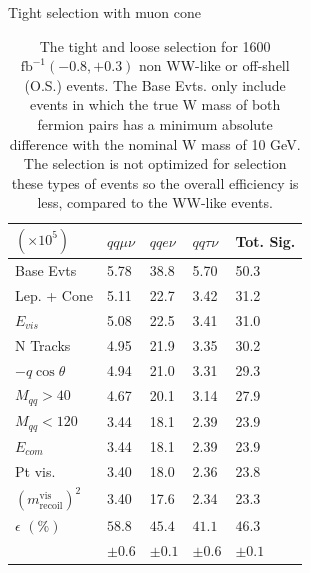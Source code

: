 \begin{table}
\centering
\caption{The tight and loose selection for 1600 $\text{fb}^{-1} (-0.8,+0.3)$ non WW-like or off-shell (O.S.) events.  The Base
Evts. only include events in which the true W mass of both fermion pairs has a minimum absolute difference
with the nominal W mass of 10 GeV. The selection is not optimized for selection these types of events so the overall efficiency is less, compared to the WW-like events.}
\begin{minipage}{0.49\linewidth}
\scriptsize
 Tight selection with muon cone \\
\begin{tabular}{|p{}|p{}p{}p{}|p{}|}
\hline
  $(\times 10^5)$& $qq\mu\nu$ & $qqe\nu$ & $qq\tau\nu$ & Tot. Sig. \\ 
\hline
Base Evts &{5.78 } & {38.8 } & {5.70} & 50.3\\ 
 
Lep. + Cone &{5.11 } & {22.7 } & {3.42} & 31.2\\ 

$E_{vis}$ &{5.08 } & {22.5 } & {3.41} & 31.0\\ 

N Tracks &{4.95 } & {21.9 } & {3.35}& 30.2\\ 
 
$-q\cos\theta$ &{4.94 } & {21.0 } & {3.31}& 29.3\\ 
 
$M_{qq}>40$ &{4.67} & {20.1 } & {3.14} & 27.9\\ 
 
$M_{qq}<120$ &{3.44 } & {18.1 } & {2.39} & 23.9\\ 

$E_{com}$ &{3.44 } & {18.1 } & {2.39} & 23.9\\ 
 
Pt vis. &{3.40 } & {18.0 } & {2.36} & 23.8\\ 
 
$(m^{\text{vis}}_{\text{recoil}})^2$ & {3.40 } & {17.6 } & {2.34}& 23.3\\ 
\hline 
 $\epsilon \, \, (\%)$ & $58.8$ & $45.4$ & $41.1$ & $46.3$ \\ 
 						& $\pm 0.6$ & $\pm 0.1$ & $\pm 0.6$ & $\pm 0.1$\\
 \hline
\end{tabular}
\end{minipage}



\end{table}
